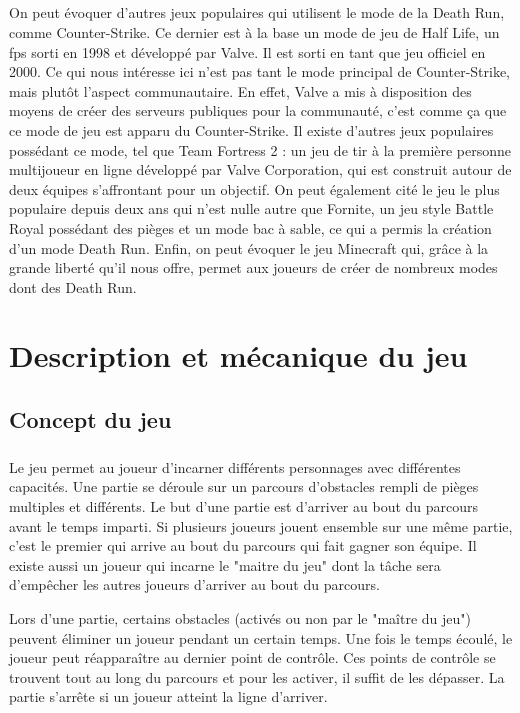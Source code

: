\documentclass[12pt]{report}
\begin{document}
	\paragraph{}
	On peut évoquer d'autres jeux populaires qui utilisent le mode de la Death Run, comme Counter-Strike. Ce dernier est à la base un mode de jeu de Half Life, un fps sorti en 1998 et développé par Valve. Il est sorti en tant que jeu officiel en 2000. Ce qui nous intéresse ici n'est pas tant le mode principal de Counter-Strike, mais plutôt l'aspect communautaire. En effet, Valve a mis à disposition des moyens de créer des serveurs publiques pour la communauté, c'est comme ça que ce mode de jeu est apparu du Counter-Strike.
	Il existe d'autres jeux populaires possédant ce mode, tel que Team Fortress 2 : un jeu de tir à la première personne multijoueur en ligne développé par Valve Corporation, qui est construit autour de deux équipes s'affrontant pour un objectif. On peut également cité le jeu le plus populaire depuis deux ans qui n'est nulle autre que Fornite, un jeu style Battle Royal possédant des pièges et un mode bac à sable, ce qui a permis la création d'un mode Death Run. Enfin, on peut évoquer le jeu Minecraft qui, grâce à la grande liberté qu'il nous offre, permet aux joueurs de créer de nombreux modes dont des Death Run.

\chapter{Description et mécanique du jeu}

	\section{Concept du jeu}
	\paragraph{}
		Le jeu permet au joueur d'incarner différents personnages avec différentes capacités. Une partie se déroule sur un parcours d'obstacles rempli de pièges multiples et différents. Le but d'une partie est d'arriver au bout du parcours avant le temps imparti. Si plusieurs joueurs jouent ensemble sur une même partie, c'est le premier qui arrive au bout du parcours qui fait gagner son équipe. Il existe aussi un joueur qui incarne le "maitre du jeu" dont la tâche sera d'empêcher les autres joueurs d'arriver au bout du parcours.
	
Lors d'une partie, certains obstacles (activés ou non par le "maître du jeu") peuvent éliminer un joueur pendant un certain temps. Une fois le temps écoulé, le joueur peut réapparaître au dernier point de contrôle. Ces points de contrôle se trouvent tout au long du parcours et pour les activer, il suffit de les dépasser. La partie s'arrête si un joueur atteint la ligne d'arriver.
\end{document}
